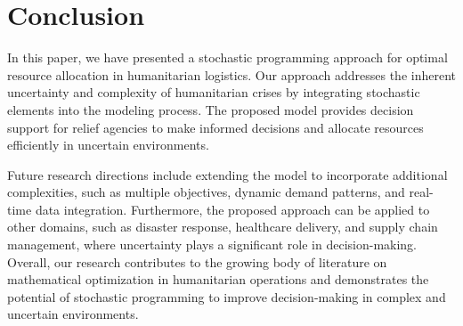 \documentclass[opre,sglanonrev]{informs4}
\begin{document}
\section{Conclusion}\label{sec:Conclusion}
In this paper, we have presented a stochastic programming approach for optimal resource allocation in humanitarian logistics. Our approach addresses the inherent uncertainty and complexity of humanitarian crises by integrating stochastic elements into the modeling process. The proposed model provides decision support for relief agencies to make informed decisions and allocate resources efficiently in uncertain environments.

Future research directions include extending the model to incorporate additional complexities, such as multiple objectives, dynamic demand patterns, and real-time data integration. Furthermore, the proposed approach can be applied to other domains, such as disaster response, healthcare delivery, and supply chain management, where uncertainty plays a significant role in decision-making. Overall, our research contributes to the growing body of literature on mathematical optimization in humanitarian operations and demonstrates the potential of stochastic programming to improve decision-making in complex and uncertain environments.


%
%
%





\end{document}
